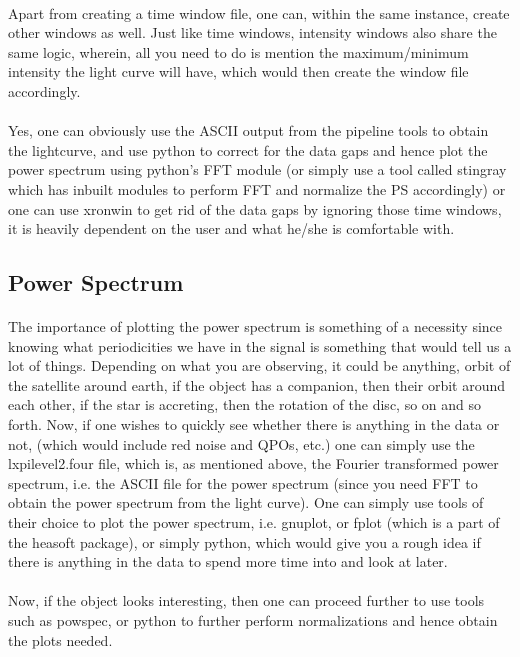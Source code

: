 \documentclass[a4paper,twoside]{report}
\numberwithin{equation}{section}
\begin{document}
\paragraph{}
Apart from creating a time window file, one can, within the same instance, create other windows as well. Just like time windows, intensity windows also share the same logic, wherein, all you need to do is mention the maximum/minimum intensity the light curve will have, which would then create the window file accordingly. 
\paragraph{}
Yes, one can obviously use the ASCII output from the pipeline tools to obtain the lightcurve, and use python to correct for the data gaps and hence plot the power spectrum using python's FFT module (or simply use a tool called stingray which has inbuilt modules to perform FFT and normalize the PS accordingly) or one can use xronwin to get rid of the data gaps by ignoring those time windows, it is heavily dependent on the user and what he/she is comfortable with. 
\subsection{Power Spectrum}
\paragraph{}
The importance of plotting the power spectrum is something of a necessity since knowing what periodicities we have in the signal is something that would tell us a lot of things. Depending on what you are observing, it could be anything, orbit of the satellite around earth, if the object has a companion, then their orbit around each other, if the star is accreting, then the rotation of the disc, so on and so forth. Now, if one wishes to quickly see whether there is anything in the data or not, (which would include red noise and QPOs, etc.) one can simply use the lxpilevel2.four file, which is, as mentioned above, the Fourier transformed power spectrum, i.e. the ASCII file for the power spectrum (since you need FFT to obtain the power spectrum from the light curve). One can simply use tools of their choice to plot the power spectrum, i.e. gnuplot, or fplot (which is a part of the heasoft package), or simply python, which would give you a rough idea if there is anything in the data to spend more time into and look at later. 
\paragraph{}
Now, if the object looks interesting, then one can proceed further to use tools such as powspec, or python to further perform normalizations and hence obtain the plots needed. 
\end{document}
